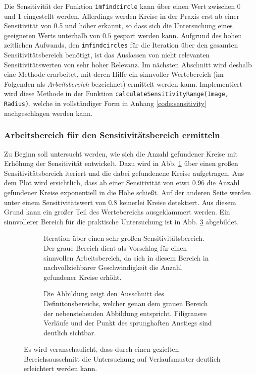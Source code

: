 \documentclass[accentcolor=tud1c, 11pt, toc=bib, toc=listof, captions=abovetable, parskip=half]{tudreport}
\begin{document}
Die Sensitivität der Funktion \lstinline|imfindcircle| kann über einen Wert zwischen $0$ und $1$ eingestellt werden. Allerdings werden Kreise in der Praxis erst ab einer Sensitivität von 0.5 und höher erkannt, so dass sich die Untersuchung eines geeigneten Werts unterhalb von $0.5$ gespart werden kann. Aufgrund des hohen zeitlichen Aufwands, den \lstinline|imfindcircles| für die Iteration über den gesamten Sensitivitätsbereich benötigt, ist das Auslassen von nicht relevanten Sensitivitätswerten von sehr hoher Relevanz. Im nächsten Abschnitt wird deshalb eine Methode erarbeitet, mit deren Hilfe ein sinnvoller Wertebereich (im Folgenden als \textit{Arbeitsbereich} bezeichnet) ermittelt werden kann. Implementiert wird diese Methode in der Funktion \lstinline|calculateSensitivityRange(Image, Radius)|, welche in vollständiger Form in Anhang \ref{code:sensitivity} nachgeschlagen werden kann.

\subsubsection{Arbeitsbereich für den Sensitivitätsbereich ermitteln}
\label{ssec:arbeitsbereich}
Zu Beginn soll untersucht werden, wie sich die Anzahl gefundener Kreise mit Erhöhung der Sensitivität entwickelt. Dazu wird in Abb. \ref{fig:115veryLargeRange} über einen großen Sensitivitätsbereich iteriert und die dabei gefundenene Kreise aufgetragen. Aus dem Plot wird ersichtlich, dass ab einer Sensitivität von etwa $0.96$ die Anzahl gefundener Kreise exponentiell in die Höhe schießt. Auf der anderen Seite werden unter einem Sensitivitätswert von $0.8$ keinerlei Kreise detektiert. Aus diesem Grund kann ein großer Teil des Wertebereichs ausgeklammert werden. Ein sinnvollerer Bereich für die praktische Untersuchung ist in Abb. \ref{fig:115veryLargeRangeClipped} abgebildet.\\

\begin{figure}[h!]
    \centering
    \begin{subfigure}[b]{0.475\textwidth}
        \centering
        
        \caption{Iteration über einen sehr großen Sensitivitätsbereich. Der graue Bereich dient als Vorschlag für einen sinnvollen Arbeitsbereich, da sich in diesem Bereich in nachvollziehbarer Geschwindigkeit die Anzahl gefundener Kreise erhöht.}
        \label{fig:115veryLargeRange}
    \end{subfigure}
    \hfill
    \begin{subfigure}[b]{0.475\textwidth}
        \centering
        
        \caption{Die Abbildung zeigt den Ausschnitt des Definitonsbereichs, welcher genau dem grauen Bereich der nebenstehenden Abbildung entspricht. Filigranere Verläufe und der Punkt des sprunghaften Anstiegs sind deutlich sichtbar.}
        \label{fig:115veryLargeRangeClipped}
    \end{subfigure}
    \caption{Es wird veranschaulicht, dass durch einen gezielten Bereichsausschnitt die Untersuchung auf Verlaufsmuster deutlich erleichtert werden kann.}
\end{figure}
\end{document}
